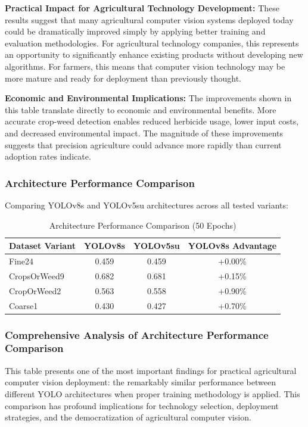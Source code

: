 \textbf{Practical Impact for Agricultural Technology Development:} These results suggest that many agricultural computer vision systems deployed today could be dramatically improved simply by applying better training and evaluation methodologies. For agricultural technology companies, this represents an opportunity to significantly enhance existing products without developing new algorithms. For farmers, this means that computer vision technology may be more mature and ready for deployment than previously thought.

\textbf{Economic and Environmental Implications:} The improvements shown in this table translate directly to economic and environmental benefits. More accurate crop-weed detection enables reduced herbicide usage, lower input costs, and decreased environmental impact. The magnitude of these improvements suggests that precision agriculture could advance more rapidly than current adoption rates indicate.

\subsubsection{Architecture Performance Comparison}

Comparing YOLOv8s and YOLOv5su architectures across all tested variants:

\begin{table}[H]
\centering
\caption{Architecture Performance Comparison (50 Epochs)}
\label{tab:architecture_comparison_50}
\begin{tabular}{@{}lccc@{}}
\toprule
\textbf{Dataset Variant} & \textbf{YOLOv8s} & \textbf{YOLOv5su} & \textbf{YOLOv8s Advantage} \\
\midrule
Fine24 & 0.459 & 0.459 & +0.00\% \\
CropsOrWeed9 & 0.682 & 0.681 & +0.15\% \\
CropOrWeed2 & 0.563 & 0.558 & +0.90\% \\
Coarse1 & 0.430 & 0.427 & +0.70\% \\
\bottomrule
\end{tabular}
\end{table}

\subsubsection{Comprehensive Analysis of Architecture Performance Comparison}

This table presents one of the most important findings for practical agricultural computer vision deployment: the remarkably similar performance between different YOLO architectures when proper training methodology is applied. This comparison has profound implications for technology selection, deployment strategies, and the democratization of agricultural computer vision.

